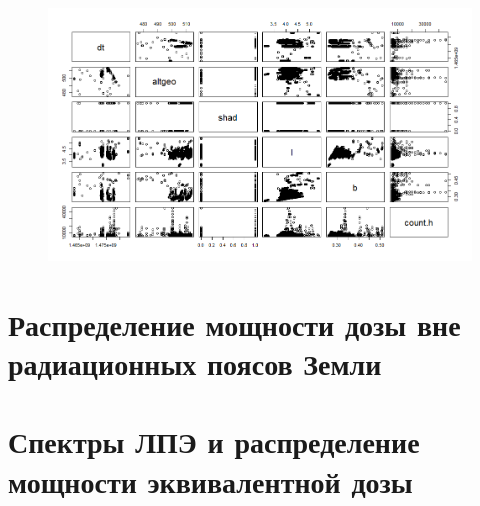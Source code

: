 \begin{figure}
	\centering
	\includegraphics[width=0.7\linewidth]{images/Flash/Rplot08}
	\caption{}
	\label{fig:rplot08}
\end{figure}

\section{Распределение мощности дозы вне радиационных поясов Земли}

\section{Спектры ЛПЭ и распределение мощности эквивалентной дозы}